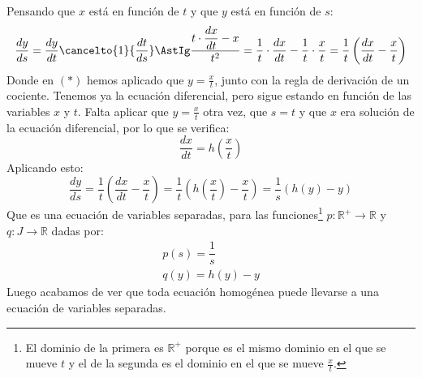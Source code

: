 Pensando que $x$ está en función de $t$ y que $y$ está en función de $s$:
\begin{equation*}
    \dfrac{dy}{ds} = \dfrac{dy}{dt}\cancelto{1}{\dfrac{dt}{ds}} \AstIg \dfrac{t\cdot \dfrac{dx}{dt}-x}{t^2} = \dfrac{1}{t}\cdot \dfrac{dx}{dt} - \dfrac{1}{t}\cdot \dfrac{x}{t} = \dfrac{1}{t} \left(\dfrac{dx}{dt}-\dfrac{x}{t}\right)
\end{equation*}
Donde en $(\ast)$ hemos aplicado que $y = \frac{x}{t}$, junto con la regla de derivación de un cociente. Tenemos ya la ecuación diferencial, pero sigue estando en función de las variables $x$ y $t$. Falta aplicar que $y=\frac{x}{t}$ otra vez, que $s=t$ y que $x$ era solución de la ecuación diferencial, por lo que se verifica:
\begin{equation*}
    \dfrac{dx}{dt} = h\left(\dfrac{x}{t}\right)
\end{equation*}
Aplicando esto:
\begin{equation*}
    \dfrac{dy}{ds} = \dfrac{1}{t}\left(\dfrac{dx}{dt}-\dfrac{x}{t}\right) = \dfrac{1}{t}\left(h\left(\dfrac{x}{t}\right) - \dfrac{x}{t}\right) = \dfrac{1}{s}(h(y)-y)
\end{equation*}
Que es una ecuación de variables separadas, para las funciones\footnote{El dominio de la primera es $\mathbb{R}^+$ porque es el mismo dominio en el que se mueve $t$ y el de la segunda es el dominio en el que se mueve $\frac{x}{t}$.} $p:\mathbb{R}^+\rightarrow\mathbb{R}$ y $q:J\rightarrow\mathbb{R}$ dadas por:
\begin{gather*}
    p(s) = \dfrac{1}{s} \\
    q(y) = h(y) -y
\end{gather*}
Luego acabamos de ver que toda ecuación homogénea puede llevarse a una ecuación de variables separadas.\\

